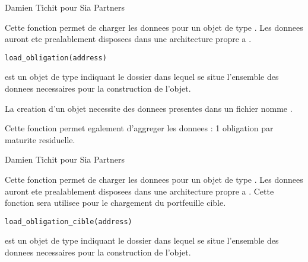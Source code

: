 \documentclass[a4paper]{book}
\begin{document}
%
\begin{Author}\relax
Damien Tichit pour Sia Partners
\end{Author}
%
\begin{Description}\relax
Cette fonction permet de charger les donnees pour un objet de type . Les donnees auront ete prealablement disposees dans
une architecture propre a .
\end{Description}
%
\begin{Usage}
\begin{verbatim}
load_obligation(address)
\end{verbatim}
\end{Usage}
%
\begin{Arguments}
\begin{ldescription}
\item[\code{address}] est un objet de type  indiquant le dossier dans lequel se situe l'ensemble des donnees necessaires
pour la construction de l'objet.
\end{ldescription}
\end{Arguments}
%
\begin{Details}\relax
La creation d'un objet  necessite des donnees presentes dans un fichier nomme .

Cette fonction permet egalement d'aggreger les donnees : 1 obligation par maturite residuelle.
\end{Details}
%
\begin{Author}\relax
Damien Tichit pour Sia Partners
\end{Author}
%
\begin{Description}\relax
Cette fonction permet de charger les donnees pour un objet de type . Les donnees auront ete prealablement disposees dans
une architecture propre a . Cette fonction sera utilisee pour le chargement du portfeuille cible.
\end{Description}
%
\begin{Usage}
\begin{verbatim}
load_obligation_cible(address)
\end{verbatim}
\end{Usage}
%
\begin{Arguments}
\begin{ldescription}
\item[\code{address}] est un objet de type  indiquant le dossier dans lequel se situe l'ensemble des donnees necessaires
pour la construction de l'objet.
\end{ldescription}
\end{Arguments}
\end{document}
